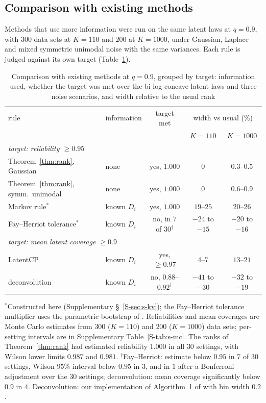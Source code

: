 \documentclass[12pt]{article}
\theoremstyle{definition}
\begin{document}
\subsection{Comparison with existing methods}\label{sec:competitors}

Methods that use more information were run on the same latent laws at $q = 0.9$, with $300$ data sets at $K = 110$ and $200$ at $K = 1000$, under Gaussian, Laplace and mixed symmetric unimodal noise with the same variances. Each rule is judged against its own target (Table~\ref{tab:competitors}).

\begin{table}[htbp]
\renewcommand{\baselinestretch}{1}
\caption{Comparison with existing methods at $q = 0.9$, grouped by target: information used, whether the target was met over the bi-log-concave latent laws and three noise scenarios, and width relative to the usual rank}
\label{tab:competitors}
\centering
\fontsize{9}{11pt}\selectfont\setlength{\tabcolsep}{4pt}
\begin{tabular}{llccc}
\toprule
rule & information & target met & \multicolumn{2}{c}{width vs usual (\%)} \\
& & & $K = 110$ & $K = 1000$ \\
\midrule
\multicolumn{5}{l}{\emph{target: reliability $\ge 0.95$}} \\
Theorem~\ref{thm:rank}, Gaussian & none & yes, $1.000$ & $0$ & $0.3$--$0.5$ \\
Theorem~\ref{thm:rank}, symm.\ unimodal & none & yes, $1.000$ & $0$ & $0.6$--$0.9$ \\
Markov rule$^*$ & known $D_i$ & yes, $1.000$ & $19$--$25$ & $20$--$26$ \\
Fay--Herriot tolerance$^*$ & known $D_i$ & no, in $7$ of $30^\dagger$ & $-24$ to $-15$ & $-20$ to $-16$ \\
\multicolumn{5}{l}{\emph{target: mean latent coverage $\ge 0.9$}} \\
LatentCP & known $D_i$ & yes, $\ge 0.97$ & $4$--$7$ & $13$--$21$ \\
deconvolution & known $D_i$ & no, $0.88$--$0.92^\dagger$ & $-41$ to $-30$ & $-32$ to $-19$ \\
\bottomrule
\end{tabular}
\par\smallskip
\parbox{\textwidth}{\fontsize{8}{10pt}\selectfont $^*$Constructed here (Supplementary \S~\ref{S-sec:s-kv}); the Fay--Herriot tolerance multiplier uses the parametric bootstrap of \citet*{chatterjee2008}. Reliabilities and mean coverages are Monte Carlo estimates from $300$ ($K = 110$) and $200$ ($K = 1000$) data sets; per-setting intervals are in Supplementary Table~\ref{S-tab:s-mc}. The ranks of Theorem~\ref{thm:rank} had estimated reliability $1.000$ in all $30$ settings, with Wilson lower limits $0.987$ and $0.981$. $^\dagger$Fay--Herriot: estimate below $0.95$ in $7$ of $30$ settings, Wilson $95\%$ interval below $0.95$ in $3$, and in $1$ after a Bonferroni adjustment over the $30$ settings; deconvolution: mean coverage significantly below $0.9$ in $4$. Deconvolution: our implementation of Algorithm~1 of \citet*{cohen2025} with bin width $0.2$.}
\end{table}
\end{document}
